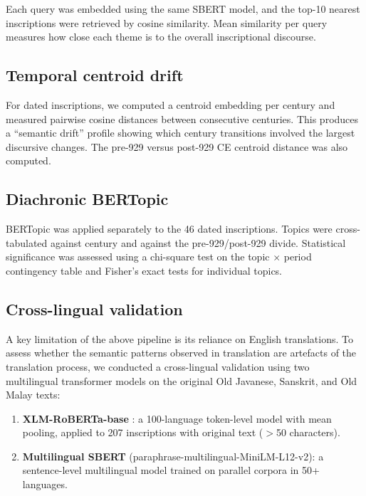 \documentclass[12pt]{article}
\begin{document}
Each query was embedded using the same SBERT model, and the top-10 nearest inscriptions were retrieved by cosine similarity.
Mean similarity per query measures how close each theme is to the overall inscriptional discourse.

\subsection{Temporal centroid drift}

For dated inscriptions, we computed a centroid embedding per century and measured pairwise cosine distances between consecutive centuries.
This produces a ``semantic drift'' profile showing which century transitions involved the largest discursive changes.
The pre-929 versus post-929 CE centroid distance was also computed.

\subsection{Diachronic BERTopic}

BERTopic was applied separately to the 46 dated inscriptions.
Topics were cross-tabulated against century and against the pre-929/post-929 divide.
Statistical significance was assessed using a chi-square test on the topic $\times$ period contingency table and Fisher's exact tests for individual topics.

\subsection{Cross-lingual validation}

A key limitation of the above pipeline is its reliance on English translations.
To assess whether the semantic patterns observed in translation are artefacts of the translation process, we conducted a cross-lingual validation using two multilingual transformer models on the original Old Javanese, Sanskrit, and Old Malay texts:

\begin{enumerate}
    \item \textbf{XLM-RoBERTa-base} \citep{Conneau2020}: a 100-language token-level model with mean pooling, applied to 207 inscriptions with original text ($>$50 characters).
    \item \textbf{Multilingual SBERT} (paraphrase-multilingual-MiniLM-L12-v2): a sentence-level multilingual model trained on parallel corpora in 50+ languages.
\end{enumerate}
\end{document}
